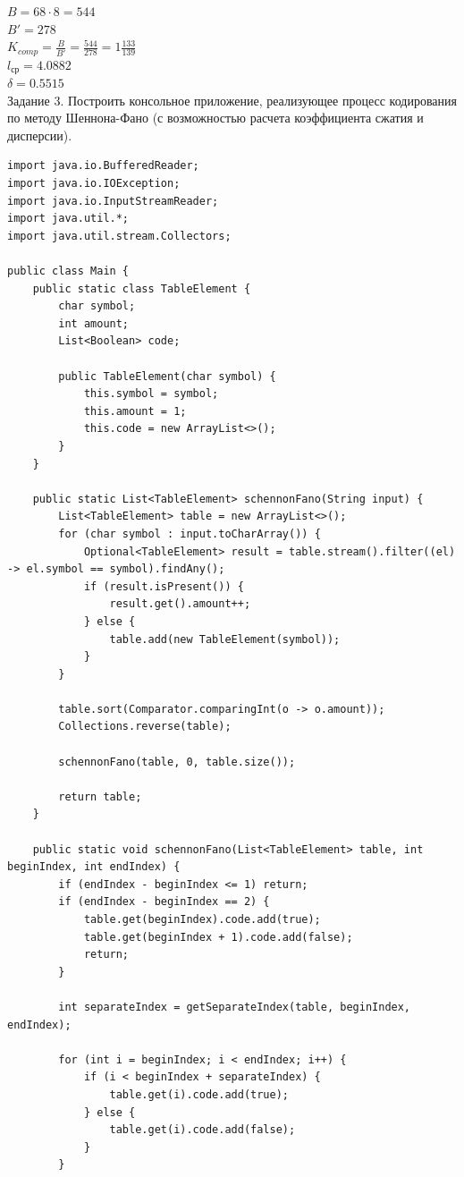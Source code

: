 \documentclass[a4paper,14pt]{extarticle}
\begin{document}
$B = 68 \cdot 8 = 544$\\
$B' = 278 $\\
$K_{comp} = \frac{B}{B'} = \frac{544}{278} = 1\frac{133}{139}$\\
$l_{ср} = 4.0882$\\
$\delta = 0.5515$\\

Задание 3. Построить консольное приложение, реализующее процесс кодирования по методу Шеннона-Фано (с возможностью расчета коэффициента сжатия и дисперсии).
\begin{verbatim}
import java.io.BufferedReader;
import java.io.IOException;
import java.io.InputStreamReader;
import java.util.*;
import java.util.stream.Collectors;

public class Main {
    public static class TableElement {
        char symbol;
        int amount;
        List<Boolean> code;

        public TableElement(char symbol) {
            this.symbol = symbol;
            this.amount = 1;
            this.code = new ArrayList<>();
        }
    }

    public static List<TableElement> schennonFano(String input) {
        List<TableElement> table = new ArrayList<>();
        for (char symbol : input.toCharArray()) {
            Optional<TableElement> result = table.stream().filter((el) -> el.symbol == symbol).findAny();
            if (result.isPresent()) {
                result.get().amount++;
            } else {
                table.add(new TableElement(symbol));
            }
        }

        table.sort(Comparator.comparingInt(o -> o.amount));
        Collections.reverse(table);

        schennonFano(table, 0, table.size());

        return table;
    }

    public static void schennonFano(List<TableElement> table, int beginIndex, int endIndex) {
        if (endIndex - beginIndex <= 1) return;
        if (endIndex - beginIndex == 2) {
            table.get(beginIndex).code.add(true);
            table.get(beginIndex + 1).code.add(false);
            return;
        }

        int separateIndex = getSeparateIndex(table, beginIndex, endIndex);

        for (int i = beginIndex; i < endIndex; i++) {
            if (i < beginIndex + separateIndex) {
                table.get(i).code.add(true);
            } else {
                table.get(i).code.add(false);
            }
        }


\end{verbatim}
\end{document}
